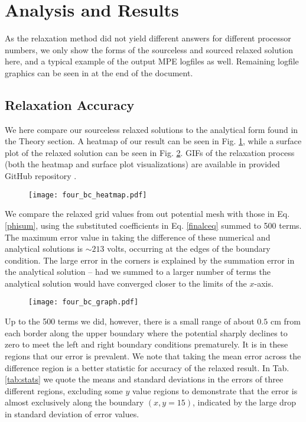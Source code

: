 \documentclass[reprint, amsmath, amssymb, aps, floatfix]{revtex4-1}
\begin{document}
\section{Analysis and Results}

As the relaxation method did not yield different answers for different processor numbers, we only show the forms of the sourceless and sourced relaxed solution here, and a typical example of the output MPE logfiles as well. Remaining logfile graphics can be seen in at the end of the document.

\subsection{Relaxation Accuracy}

We here compare our sourceless relaxed solutions to the analytical form found in the Theory section. A heatmap of our result can be seen in Fig. \ref{heatmapnosource}, while a surface plot of the relaxed solution can be seen in Fig. \ref{graphnosource}. GIFs of the relaxation process (both the heatmap and surface plot visualizations) are available in provided GitHub repository \cite{git}.

\begin{figure}
	\texttt{[image: four\_bc\_heatmap.pdf]}
	\label{heatmapnosource}
\end{figure}

We compare the relaxed grid values from out potential mesh with those in Eq. \eqref{phisum}, using the substituted coefficients in Eq. \eqref{finalceq} summed to 500 terms. The maximum error value in taking the difference of these numerical and analytical solutions is $\sim 213$ volts, occurring at the edges of the boundary condition. The large error in the corners is explained by the summation error in the analytical solution -- had we summed to a larger number of terms the analytical solution would have converged closer to the limits of the $x$-axis. 


\begin{figure}
	\texttt{[image: four\_bc\_graph.pdf]}
	\label{graphnosource}
\end{figure}


Up to the 500 terms we did, however, there is a small range of about $0.5$ cm from each border along the upper boundary where the potential sharply declines to zero to meet the left and right boundary conditions prematurely. It is in these regions that our error is prevalent. We note that taking the mean error across the difference region is a better statistic for accuracy of the relaxed result. In Tab. \ref{tab:stats} we quote the means and standard deviations in the errors of three different regions, excluding some $y$ value regions to demonstrate that the error is almost exclusively along the boundary $(x, y=15)$, indicated by the large drop in standard deviation of error values.
\end{document}

